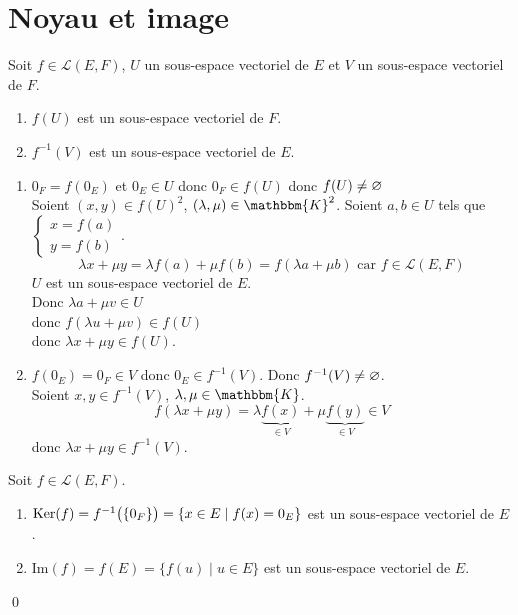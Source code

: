 \part{Noyau et image}

\begin{prop}
	Soit $f \in \mathcal{L}(E,F)$, $U$ un sous-espace vectoriel de $E$ et $V$ un sous-espace vectoriel de $F$.
	\begin{enumerate}
		\item $f(U)$ est un sous-espace vectoriel de $F$.
		\item $f^{-1}(V)$ est un sous-espace vectoriel de $E$.
	\end{enumerate}
\end{prop}

\begin{prv}
	\begin{enumerate}
		\item $0_F = f(0_E)$ et $0_E \in U$ donc $0_F \in f(U)$ donc $f(U) \neq \varnothing$\\
			Soient $(x,y) \in f(U)^2$, $(\lambda, \mu) \in \mathbbm{K}^2$. Soient $a,b \in U$ tels que $\begin{cases}
				x= f(a)\\
				y = f(b)
			\end{cases}$.\\
			\[
				\lambda x + \mu y = \lambda f(a) + \mu f(b) = f(\lambda a + \mu b) \text{ car } f \in \mathcal{L}(E,F)
			\] $U$ est un sous-espace vectoriel de $E$.\\
			Donc $\lambda a + \mu v \in U$\\
			donc $f(\lambda u + \mu v) \in f(U)$ \\
			donc $\lambda x + \mu y \in f(U)$.
		\item $f(0_E) = 0_F \in V$ donc $0_E \in f^{-1}(V)$. Donc $f^{-1}(V) \neq \varnothing$.\\
			Soient $x,y \in f^{-1}(V)$, $\lambda, \mu \in \mathbbm{K}$.
			\[
				f(\lambda x + \mu y) = \lambda\underbrace{f(x)}_{\in V} + \mu \underbrace{f(y)}_{\in V} \in V
			\] donc $\lambda x + \mu y \in f^{-1}(V)$.
	\end{enumerate}
\end{prv}

\begin{crlr}
	Soit $f \in \mathcal{L}(E,F)$.
	\begin{enumerate}
		\item $\operatorname{Ker}(f) = f^{-1}\big(\{0_F\}\big) = \{x \in E \mid f(x) = 0_E\}$ est un sous-espace vectoriel de $E$.
		\item $\mathrm{Im}(f) = f(E) = \{f(u)  \mid u \in E\}$ est un sous-espace vectoriel de $E$.
	\end{enumerate}
	\qed
\end{crlr}

